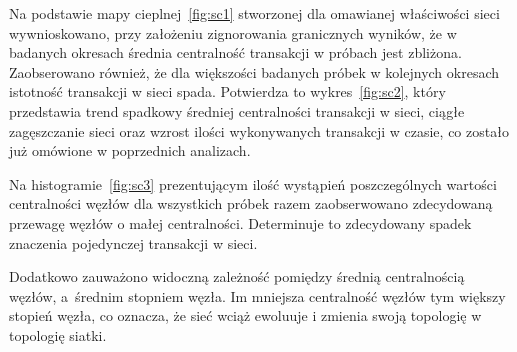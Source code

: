 \documentclass[12pt, twoside, final, openany]{mgr}
\begin{document}
\indent Na podstawie mapy cieplnej~\ref{fig:sc1} stworzonej dla omawianej właściwości sieci wywnioskowano, przy założeniu zignorowania granicznych wyników, że w badanych okresach średnia centralność transakcji w próbach jest zbliżona. Zaobserowano również, że dla większości badanych próbek w kolejnych okresach istotność transakcji w sieci spada. Potwierdza to wykres~\ref{fig:sc2}, który przedstawia trend spadkowy średniej centralności transakcji w sieci, ciągłe zagęszczanie sieci oraz wzrost ilości wykonywanych transakcji w czasie, co zostało już omówione w poprzednich analizach.

\indent Na histogramie~\ref{fig:sc3} prezentującym ilość wystąpień poszczególnych wartości centralności węzłów dla wszystkich próbek razem zaobserwowano zdecydowaną przewagę węzłów o małej centralności. Determinuje to zdecydowany spadek znaczenia pojedynczej transakcji w sieci.

\indent Dodatkowo zauważono widoczną zależność pomiędzy średnią centralnością węzłów, a~średnim stopniem węzła. Im mniejsza centralność węzłów tym większy stopień węzła, co oznacza, że sieć wciąż ewoluuje i zmienia swoją topologię w topologię siatki. 
\end{document}
